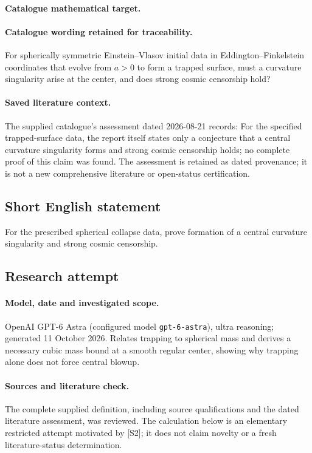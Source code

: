\documentclass[11pt]{article}
\begin{document}
\paragraph{Catalogue mathematical target.}
\paragraph{Catalogue wording retained for traceability.}
For spherically symmetric Einstein–Vlasov initial data in Eddington–Finkelstein coordinates that evolve from $a>0$ to form a trapped surface, must a curvature singularity arise at the center, and does strong cosmic censorship hold?

\paragraph{Saved literature context.} The supplied catalogue's assessment dated 2026-08-21 records: For the specified trapped-surface data, the report itself states only a conjecture that a central curvature singularity forms and strong cosmic censorship holds; no complete proof of this claim was found. The assessment is retained as dated provenance; it is not a new comprehensive literature or open-status certification.
\subsection{Short English statement}
For the prescribed spherical collapse data, prove formation of a central curvature singularity and strong cosmic censorship.
\subsection{Research attempt}
\paragraph{Model, date and investigated scope.}
OpenAI GPT-6 Astra (configured model \texttt{gpt-6-astra}), ultra reasoning; generated 11 October 2026. Relates trapping to spherical mass and derives a necessary cubic mass bound at a smooth regular center, showing why trapping alone does not force central blowup.

\paragraph{Sources and literature check.}
The complete supplied definition, including source qualifications and the dated literature assessment, was reviewed. The calculation below is an elementary restricted attempt motivated by [S2]; it does not claim novelty or a fresh literature-status determination.
\end{document}
